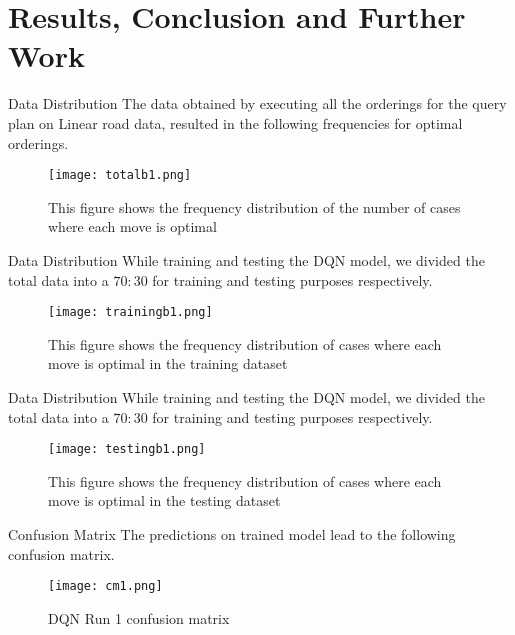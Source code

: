 
\section{Results, Conclusion and Further Work}
\frame{\sectionpage}

\begin{frame}{Data Distribution}
    The data obtained by executing all the orderings for the query plan on Linear road data, resulted in the following frequencies for optimal orderings.
    \begin{figure}
        \centering
        \texttt{[image: totalb1.png]}\\
        \caption{This figure shows the frequency distribution of the number of cases where each move is optimal}
        \label{fig:totalb1}
    \end{figure}
\end{frame}


\begin{frame}{Data Distribution}
    While training and testing the DQN model, we divided the total data into a $70:30$ for training and testing purposes respectively.
    \begin{figure}
        \centering
        \texttt{[image: trainingb1.png]}\\
        \caption{This figure shows the frequency distribution of cases where each move is optimal in the training dataset}
        \label{fig:trainingb1}
    \end{figure}
\end{frame}

\begin{frame}{Data Distribution}
    While training and testing the DQN model, we divided the total data into a $70:30$ for training and testing purposes respectively.
    \begin{figure}
        \centering
        \texttt{[image: testingb1.png]}\\
        \caption{This figure shows the frequency distribution of cases where each move is optimal in the testing dataset}
        \label{fig:testingb1}
    \end{figure}
\end{frame}


\begin{frame}{Confusion Matrix}
    The predictions on trained model lead to the following confusion matrix.
    \begin{figure}
        \centering
        \texttt{[image: cm1.png]}\\
        \caption{DQN Run 1 confusion matrix}
        \label{fig:dqn_r1_1}
    \end{figure}
\end{frame}

